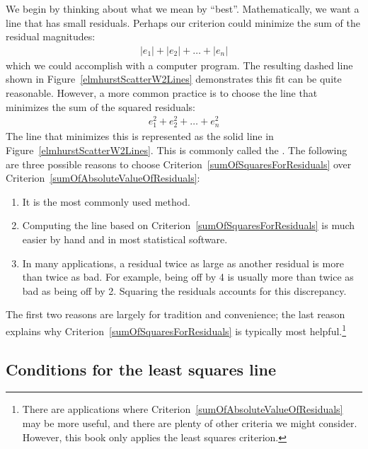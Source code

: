 We begin by thinking about what we mean by ``best''. Mathematically, we want a line that has small residuals. Perhaps our criterion could minimize the sum of the residual magnitudes:
\begin{eqnarray}
|e_1| + |e_2| + \dots + |e_n|
\label{sumOfAbsoluteValueOfResiduals}
\end{eqnarray}
which we could accomplish with a computer program. The resulting dashed line shown in Figure~\ref{elmhurstScatterW2Lines} demonstrates this fit can be quite reasonable. However, a more common practice is to choose the line that minimizes the sum of the squared residuals:
\begin{eqnarray}
e_{1}^2 + e_{2}^2 + \dots + e_{n}^2
\label{sumOfSquaresForResiduals}
\end{eqnarray}
The line that minimizes this  is represented as the solid line in Figure~\ref{elmhurstScatterW2Lines}. This is commonly called the . The following are three possible reasons to choose Criterion~\eqref{sumOfSquaresForResiduals} over Criterion~\eqref{sumOfAbsoluteValueOfResiduals}:
\begin{enumerate}
\item It is the most commonly used method.
\item Computing the line based on Criterion~\eqref{sumOfSquaresForResiduals} is much easier by hand and in most statistical software.
\item In many applications, a residual twice as large as another residual is more than twice as bad. For example, being off by 4 is usually more than twice as bad as being off by 2. Squaring the residuals accounts for this discrepancy.
\end{enumerate}
The first two reasons are largely for tradition and convenience; the last reason explains why Criterion~\eqref{sumOfSquaresForResiduals} is typically most helpful.\footnote{There are applications where Criterion~\eqref{sumOfAbsoluteValueOfResiduals} may be more useful, and there are plenty of other criteria we might consider. However, this book only applies the least squares criterion.}


\subsection{Conditions for the least squares line}

